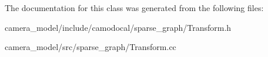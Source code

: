 The documentation for this class was generated from the following files\+:\begin{DoxyCompactItemize}
\item 
camera\+\_\+model/include/camodocal/sparse\+\_\+graph/Transform.\+h\item 
camera\+\_\+model/src/sparse\+\_\+graph/Transform.\+cc\end{DoxyCompactItemize}
